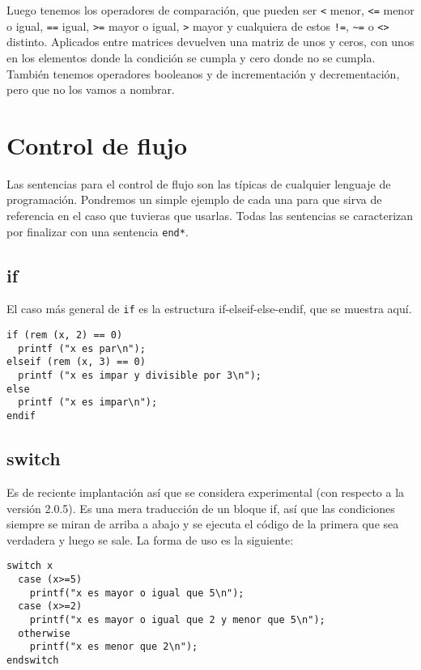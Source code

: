Luego tenemos los  operadores de comparación, que  pueden ser \verb|<|
menor, \verb|<=|  menor o  igual, \verb|==|  igual, \verb|>=|  mayor o
igual, \verb|>|  mayor y  cualquiera de  estos \verb|!=|,  \verb|~=| o
\verb|<>| distinto.  Aplicados entre matrices devuelven  una matriz de
unos y ceros, con unos en los elementos donde la condición se cumpla y
cero donde  no se  cumpla. También tenemos  operadores booleanos  y de
incrementación y decrementación, pero que no los vamos a nombrar.

\section{Control de flujo}
Las sentencias para  el control de flujo son las  típicas de cualquier
lenguaje de programación. Pondremos un simple ejemplo de cada una para
que sirva de referencia en el caso que tuvieras que usarlas. Todas las
sentencias se caracterizan por finalizar con una sentencia {\tt end*}.

\subsection{if}

El caso más general de {\tt if} es la estructura if-elseif-else-endif,
que se muestra aquí.

\begin{verbatim}
if (rem (x, 2) == 0)
  printf ("x es par\n");
elseif (rem (x, 3) == 0)
  printf ("x es impar y divisible por 3\n");
else
  printf ("x es impar\n");
endif
\end{verbatim}

\subsection{switch}

Es de  reciente implantación  así que  se considera  experimental (con
respecto a la versión 2.0.5). Es  una mera traducción de un bloque if,
así  que las  condiciones siempre  se  miran de  arriba a  abajo y  se
ejecuta el código de la primera que  sea verdadera y luego se sale. La
forma de uso es la siguiente:

\begin{verbatim}
switch x
  case (x>=5)
    printf("x es mayor o igual que 5\n");
  case (x>=2)
    printf("x es mayor o igual que 2 y menor que 5\n");
  otherwise
    printf("x es menor que 2\n");
endswitch
\end{verbatim}

